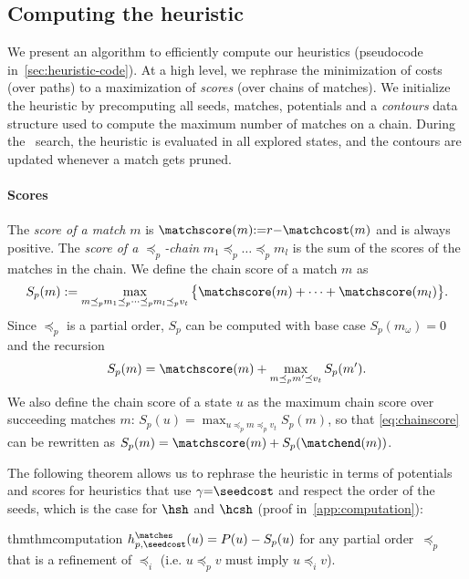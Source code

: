 \subsection{Computing the heuristic}\label{sec:computation}

We present an algorithm to efficiently compute our heuristics (pseudocode
in~\cref{sec:heuristic-code}). At a high level, we rephrase the minimization of
costs (over paths) to a maximization of \emph{scores} (over chains of matches).
We initialize the heuristic by precomputing all seeds, matches, potentials and a
\emph{contours} data structure used to compute the maximum number of matches on
a chain. During the \A~search, the heuristic is evaluated in all explored
states, and the contours are updated whenever a match gets pruned.

\paragraph{Scores} The \emph{score of a match} $m$ is
$\matchscore(m){:=}r{-}\matchcost(m)$ and is always positive. The \emph{score of
a $\preceq_p$-chain} $m_1\preceq_p \dots \preceq_p m_l$ is the sum of the scores
of the matches in the chain. We define the chain score of a match $m$ as
\begin{equation}
S_p(m):=\max_{m\preceq_p m_1\preceq_p\dots \preceq_p m_l\preceq_p v_t}\big\{\matchscore(m) + \dots + \matchscore(m_l)\big\}.
\label{eq:chain}
\end{equation}
Since $\preceq_p$ is a partial order, $S_p$ can be computed with
base case ${S_p(m_\omega) = 0}$ and the recursion
\begin{equation}
S_p(m) = \matchscore(m) + \max_{m\preceq_p m' \preceq v_t} S_p(m').
\label{eq:chainscore}
\end{equation}
We also define the chain score of a state $u$ as the maximum chain score over
succeeding matches $m$: $S_p(u) = \max_{u\preceq_p m \preceq_p v_t} S_p(m)$, so that
\cref{eq:chainscore} can be rewritten as $S_p(m) = \matchscore(m) +
S_p(\matchend(m))$.



The following theorem allows us to rephrase the heuristic in terms of
potentials and scores for heuristics that use $\gamma {=} \seedcost$ and respect
the order of the seeds, which is the case for $\hsh$ and $\hcsh$ (proof
in~\cref{app:computation}):
\begin{restatable}{thm}{thmcomputation}\label{lem:computation}
$h^\matches_{p,\seedcost}(u) = P(u) - S_p(u)$ for any partial order~$\preceq_p$
that is a refinement of $\preceq_i$ (i.e. $u\preceq_p v$ must imply $u\preceq_i
v$).
\end{restatable}

